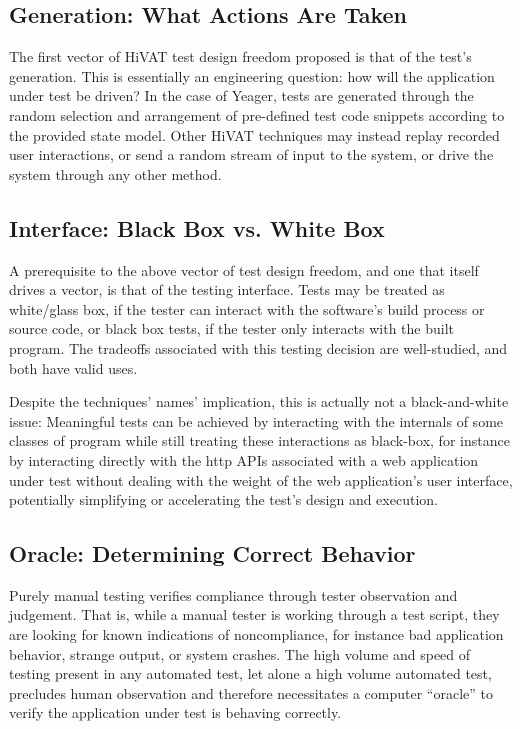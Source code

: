 \subsection{Generation: What Actions Are Taken}
The first vector of HiVAT test design freedom proposed is that of the test's generation. This is essentially an engineering question: how will the application under test be driven? In the case of Yeager, tests are generated through the random selection and arrangement of pre-defined test code snippets according to the provided state model. Other HiVAT techniques may instead replay recorded user interactions, or send a random stream of input to the system, or drive the system through any other method.

\subsection{Interface: Black Box vs. White Box}
A prerequisite to the above vector of test design freedom, and one that itself drives a vector, is that of the testing interface. Tests may be treated as white/glass box, if the tester can interact with the software's build process or source code, or black box tests, if the tester only interacts with the built program. The tradeoffs associated with this testing decision are well-studied, and both have valid uses.

Despite the techniques' names' implication, this is actually not a black-and-white issue: Meaningful tests can be achieved by interacting with the internals of some classes of program while still treating these interactions as black-box, for instance by interacting directly with the http APIs associated with a web application under test without dealing with the weight of the web application's user interface, potentially simplifying or accelerating the test's design and execution.\citep{HoffmanTradeoffs}

\subsection{Oracle: Determining Correct Behavior}
Purely manual testing verifies compliance through tester observation and judgement. That is, while a manual tester is working through a test script, they are looking for known indications of noncompliance, for instance bad application behavior, strange output, or system crashes. The high volume and speed of testing present in any automated test, let alone a high volume automated test, precludes human observation and therefore necessitates a computer ``oracle'' to verify the application under test is behaving correctly.\citep{HoffmanTaxonomy}

